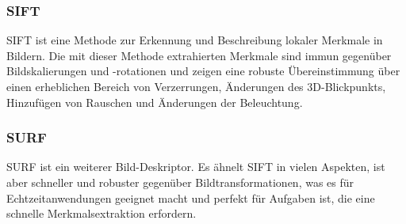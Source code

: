 \subsubsection{SIFT}
\ac{SIFT} ist eine Methode zur Erkennung und Beschreibung lokaler Merkmale in Bildern. 
Die mit dieser Methode extrahierten Merkmale sind immun gegenüber Bildskalierungen und -rotationen 
und zeigen eine robuste Übereinstimmung über einen erheblichen Bereich von Verzerrungen, Änderungen des 3D-Blickpunkts, 
Hinzufügen von Rauschen und Änderungen der Beleuchtung.~\cite{Shambhavi_Jain_2017_ieee}

\subsubsection{SURF}
\ac{SURF} ist ein weiterer Bild-Deskriptor. Es ähnelt \ac{SIFT} in vielen Aspekten, ist aber schneller und robuster gegenüber Bildtransformationen, 
was es für Echtzeitanwendungen geeignet macht und perfekt für Aufgaben ist, die eine schnelle Merkmalsextraktion erfordern.~\cite{Shambhavi_Jain_2017_ieee}